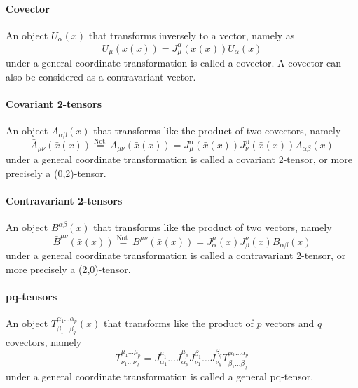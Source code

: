 \documentclass[a4paper,11pt]{article}
\numberwithin{equation}{section}
\begin{document}
{\paragraph{Covector} An object $U_\alpha(x)$ that transforms inversely to a vector, namely as \begin{equation}
\bar{U}_\mu(\bar{x}(x)) = J^\alpha_\mu(\bar{x}(x))U_\alpha(x)
\end{equation} under a general coordinate transformation is called a covector. A covector can also be considered as a contravariant vector.

\paragraph{Covariant 2-tensors} An object $A_{\alpha \beta}(x)$ that transforms like the product of two covectors, namely \begin{equation}
\bar{A}_{\mu\nu}(\bar{x}(x)) \overset{\text{Not.}}{=} A_{\mu\nu}(\bar{x}(x)) = J^\alpha_\mu(\bar{x}(x))J^\beta_\nu(\bar{x}(x))A_{\alpha\beta}(x)
\end{equation} under a general coordinate transformation is called a covariant 2-tensor, or more precisely a (0,2)-tensor.

\paragraph{Contravariant 2-tensors} An object $B^{\alpha \beta}(x)$ that transforms like the product of two vectors, namely \begin{equation}
\bar{B}^{\mu\nu}(\bar{x}(x)) \overset{\text{Not.}}{=} B^{\mu\nu}(\bar{x}(x)) = J^\mu_\alpha(x)J^\nu_\beta(x)B_{\alpha\beta}(x)
\end{equation} under a general coordinate transformation is called a contravariant 2-tensor, or more precisely a (2,0)-tensor.

\paragraph{pq-tensors} An object $T^{\alpha_1\dots\alpha_p}_{\beta_1\dots\beta_q}(x)$ that transforms like the product of $p$ vectors and $q$ covectors, namely \begin{equation}
T^{\mu_1\dots\mu_p}_{\nu_1\dots\nu_q} = J^{\mu_1}_{\alpha_1}\dots J^{\mu_p}_{\alpha_p} J^{\beta_1}_{\nu_1}\dots J^{\beta_q}_{\nu_q}T^{\alpha_1\dots \alpha_p}_{\beta_1\dots\beta_q}
\end{equation} under a general coordinate transformation is called a general pq-tensor.
}
\end{document}
